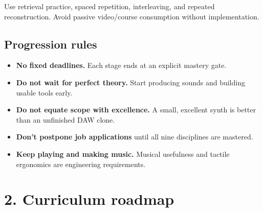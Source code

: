 \documentclass[11pt,letterpaper]{article}
\begin{document}
Use retrieval practice, spaced repetition, interleaving, and repeated reconstruction. Avoid passive video/course consumption without implementation.

\subsection*{Progression rules}\label{progression-rules}

\begin{itemize}
\item \textbf{No fixed deadlines.} Each stage ends at an explicit mastery gate.
\item \textbf{Do not wait for perfect theory.} Start producing sounds and building usable tools early.
\item \textbf{Do not equate scope with excellence.} A small, excellent synth is better than an unfinished DAW clone.
\item \textbf{Don't postpone job applications} until all nine disciplines are mastered.
\item \textbf{Keep playing and making music.} Musical usefulness and tactile ergonomics are engineering requirements.
\end{itemize}

\section{2. Curriculum roadmap}\label{curriculum-roadmap}
\end{document}
